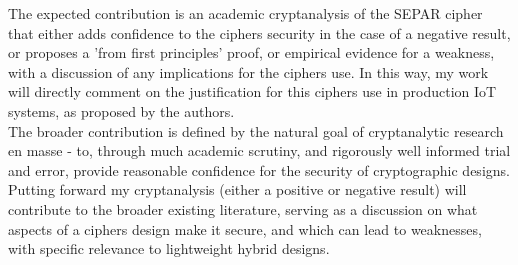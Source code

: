 \documentclass[11pt]{article}
\begin{document}
The expected contribution is an academic cryptanalysis of the SEPAR cipher that either adds confidence to the ciphers security in the case of a negative result, or proposes a 'from first principles' proof, or empirical evidence for a weakness, with a discussion of any implications for the ciphers use. In this way, my work will directly comment on the justification for this ciphers use in production IoT systems, as proposed by the authors.\\

The broader contribution is defined by the natural goal of cryptanalytic research en masse - to, through much academic scrutiny, and rigorously well informed trial and error, provide reasonable confidence for the security of cryptographic designs. Putting forward my cryptanalysis (either a positive or negative result) will contribute to the broader existing literature, serving as a discussion on what aspects of a ciphers design make it secure, and which can lead to weaknesses, with specific relevance to lightweight hybrid designs.\\
\end{document}

